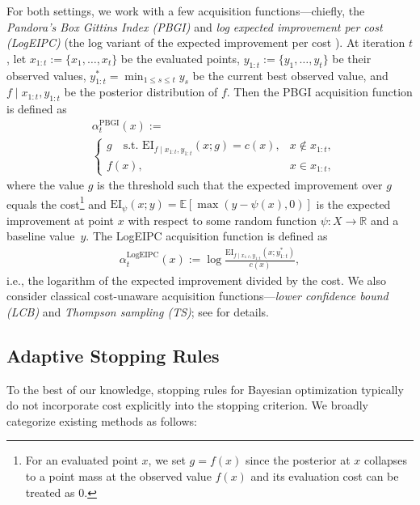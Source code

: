 For both settings, we work with a few acquisition functions---chiefly, the \emph{Pandora's Box Gittins Index (PBGI)} \citep{xie2024cost} and \emph{log expected improvement per cost (LogEIPC)} \citep{xie2024cost} (the log variant \citep{ament2023unexpected} of the expected improvement per cost \citep{snoek2012practical}).
At iteration $t$, let $x_{1:t}:=\{x_1, \dots, x_t\}$ be the evaluated points, $y_{1:t}:=\{y_1, \dots, y_t\}$ be their observed values, $y^*_{1:t}=\min_{1\leq s \leq t} y_s$ be the current best observed value, and $f \mid x_{1:t}, y_{1:t}$ be the posterior distribution of $f$. Then the PBGI acquisition function is defined as
\begin{align}
\label{eqn:PBGI}
&\alpha_t^{\mathrm{PBGI}}(x) := \nonumber\\
&\begin{cases}
g \quad \text{s.t. } %
\mathrm{EI}_{f \mid x_{1:t}, y_{1:t}}(x; g) =  c(x), & x\notin x_{1:t}, \\
f(x), & x\in x_{1:t},
\end{cases}
\end{align}
where the value $g$ is the threshold such that the expected improvement over $g$ equals the cost\footnote{For an evaluated point $x$, we set $g = f(x)$ since the posterior at $x$ collapses to a point mass at the observed value $f(x)$ and its evaluation cost can be treated as $0$.} and $\mathrm{EI}_\psi(x; y) = \mathbb{E} \left[\max(y - \psi(x),0)\right]$ is the expected improvement at point $x$ with respect to some random function $\psi : X \to \mathbb{R}$ and a baseline value~$y$.
The LogEIPC acquisition function is defined as
\begin{align}
\label{eqn:EIC} \alpha_{t}^{\mathrm{LogEIPC}}(x) := \log\frac{\mathrm{EI}_{f \mid x_{1:t}, y_{1:t}}(x; y^*_{1:t})}{c(x)},
\end{align}
i.e., the logarithm of the expected improvement divided by the cost.
We also consider classical cost-unaware acquisition functions---\emph{lower confidence bound (LCB)} and \emph{Thompson sampling (TS)}; see \citet{garnett2023bayesian} for details.


\subsection{Adaptive Stopping Rules} \label{sec:background:stopping_rule_review}
To the best of our knowledge, stopping rules for Bayesian optimization typically do not incorporate cost explicitly into the stopping criterion.
We broadly categorize existing methods as follows:

